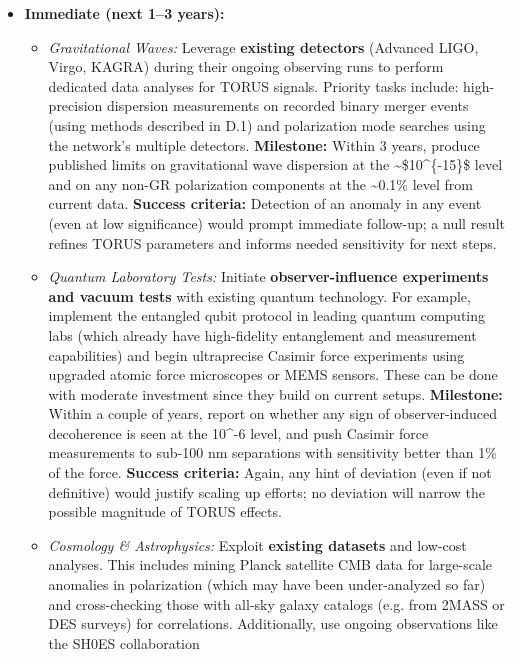 \documentclass[
]{article}
\begin{document}
{\begin{itemize}
\item
  \textbf{Immediate (next 1--3 years):}

  \begin{itemize}
  \item
    \emph{Gravitational Waves:} Leverage \textbf{existing detectors}
    (Advanced LIGO, Virgo, KAGRA) during their ongoing observing runs to
    perform dedicated data analyses for TORUS signals. Priority tasks
    include: high-precision dispersion measurements on recorded binary
    merger events (using methods described in D.1) and polarization mode
    searches using the network's multiple detectors. \textbf{Milestone:}
    Within 3 years, produce published limits on gravitational wave
    dispersion at the \textasciitilde\$10\^{}\{-15\}\$ level and on any
    non-GR polarization components at the \textasciitilde0.1\% level
    from current data. \textbf{Success criteria:} Detection of an
    anomaly in any event (even at low significance) would prompt
    immediate follow-up; a null result refines TORUS parameters and
    informs needed sensitivity for next steps.
  \item
    \emph{Quantum Laboratory Tests:} Initiate \textbf{observer-influence
    experiments and vacuum tests} with existing quantum technology. For
    example, implement the entangled qubit protocol in leading quantum
    computing labs (which already have high-fidelity entanglement and
    measurement capabilities) and begin ultraprecise Casimir force
    experiments using upgraded atomic force microscopes or MEMS sensors.
    These can be done with moderate investment since they build on
    current setups. \textbf{Milestone:} Within a couple of years, report
    on whether any sign of observer-induced decoherence is seen at the
    10\^{}-6 level, and push Casimir force measurements to sub-100 nm
    separations with sensitivity better than 1\% of the force.
    \textbf{Success criteria:} Again, any hint of deviation (even if not
    definitive) would justify scaling up efforts; no deviation will
    narrow the possible magnitude of TORUS effects.
  \item
    \emph{Cosmology \& Astrophysics:} Exploit \textbf{existing datasets}
    and low-cost analyses. This includes mining Planck satellite CMB
    data for large-scale anomalies in polarization (which may have been
    under-analyzed so far) and cross-checking those with all-sky galaxy
    catalogs (e.g. from 2MASS or DES surveys) for correlations.
    Additionally, use ongoing observations like the SH0ES collaboration

\end{itemize}
\end{itemize}}
\end{document}
